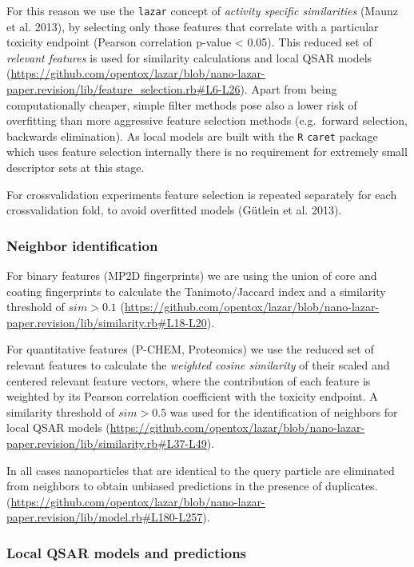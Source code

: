 \documentclass[utf8]{frontiersHLTH} %
\begin{document}
For this reason we use the \texttt{lazar} concept of \emph{activity
specific similarities} (Maunz et al. 2013), by selecting only those
features that correlate with a particular toxicity endpoint (Pearson
correlation p-value \textless{} 0.05). This reduced set of
\emph{relevant features} is used for similarity calculations and local
QSAR models
(\url{https://github.com/opentox/lazar/blob/nano-lazar-paper.revision/lib/feature_selection.rb\#L6-L26}).
Apart from being computationally cheaper, simple filter methods pose
also a lower risk of overfitting than more aggressive feature selection
methods (e.g.~forward selection, backwards elimination). As local models
are built with the \texttt{R} \texttt{caret} package which uses feature
selection internally there is no requirement for extremely small
descriptor sets at this stage.

For crossvalidation experiments feature selection is repeated separately
for each crossvalidation fold, to avoid overfitted models (Gütlein et
al. 2013).

\subsubsection{Neighbor identification}\label{neighbor-identification}

For binary features (MP2D fingerprints) we are using the union of core
and coating fingerprints to calculate the Tanimoto/Jaccard index and a
similarity threshold of \(sim > 0.1\)
(\url{https://github.com/opentox/lazar/blob/nano-lazar-paper.revision/lib/similarity.rb\#L18-L20}).

For quantitative features (P-CHEM, Proteomics) we use the reduced set of
relevant features to calculate the \emph{weighted cosine similarity} of
their scaled and centered relevant feature vectors, where the
contribution of each feature is weighted by its Pearson correlation
coefficient with the toxicity endpoint. A similarity threshold of
\(sim > 0.5\) was used for the identification of neighbors for local
QSAR models
(\url{https://github.com/opentox/lazar/blob/nano-lazar-paper.revision/lib/similarity.rb\#L37-L49}).

In all cases nanoparticles that are identical to the query particle are
eliminated from neighbors to obtain unbiased predictions in the presence
of duplicates.
(\url{https://github.com/opentox/lazar/blob/nano-lazar-paper.revision/lib/model.rb\#L180-L257}).

\subsubsection{Local QSAR models and
predictions}\label{local-qsar-models-and-predictions}
\end{document}
